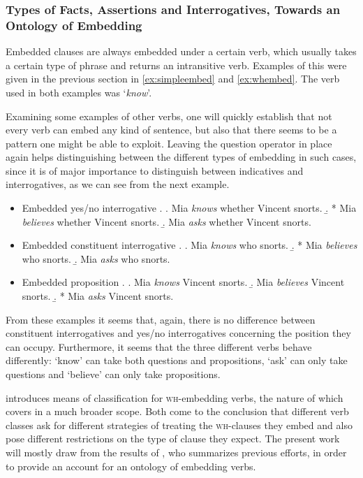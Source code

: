 \documentclass[a4paper]{article}
\newcommand{\example}[1]{`\textit{#1}'} %
\newcommand{\wh}{\textsc{wh}}
\theoremstyle{remark}
\theoremstyle{remark}
\theoremstyle{definition}
\theoremstyle{definition}
\begin{document}
\subsubsection{Types of Facts, Assertions and Interrogatives, Towards an
Ontology of Embedding}\label{sec:ontology}

Embedded clauses are always embedded under a certain verb, which usually
takes a certain type of phrase and returns an intransitive verb. Examples of
this were given in the previous section in \ref{ex:simpleembed} and
\ref{ex:whembed}. The verb used in both examples was \example{know}.

Examining some examples of other verbs, one will quickly establish that not
every verb can embed any kind of sentence, but also that there seems to be  a
pattern one might be able to exploit. Leaving the question operator in place
again helps distinguishing between the different types of embedding in such
cases, since it is of major importance to distinguish between indicatives and
interrogatives, as we can see from the next example.

\begin{itemize}
  \item Embedded yes/no interrogative
  \ex. \a. Mia \emph{knows} whether Vincent snorts.
  \b. * Mia \emph{believes} whether Vincent snorts.
  \b. Mia \emph{asks} whether Vincent snorts.

  \item Embedded constituent interrogative
  \ex. \a.  Mia \emph{knows} who snorts.
  \b. * Mia \emph{believes} who snorts.
  \b. Mia \emph{asks} who snorts.

  \item Embedded proposition
  \ex. \a. Mia \emph{knows} Vincent snorts.
  \b. Mia \emph{believes} Vincent snorts.
  \b. * Mia \emph{asks} Vincent snorts.

\end{itemize}

From these examples it seems that, again, there is no difference between
constituent interrogatives and yes/no interrogatives concerning the position
they can occupy. Furthermore, it seems that the three different verbs behave
differently: `know' can take both questions and propositions, `ask' can only
take questions and `believe' can only take propositions.

\cite{karttunen:1977} introduces means of classification for \wh-embedding
verbs, the nature of which \cite{lahiri:diss} covers in a much broader scope.
Both come to the conclusion that different verb classes ask for different
strategies of treating the \wh-clauses they embed and also pose different
restrictions on the type of clause they expect. The present work will mostly
draw from the results of \cite{ginzburg}, who summarizes previous efforts,
in order to provide an account for an ontology of embedding verbs.
\end{document}
